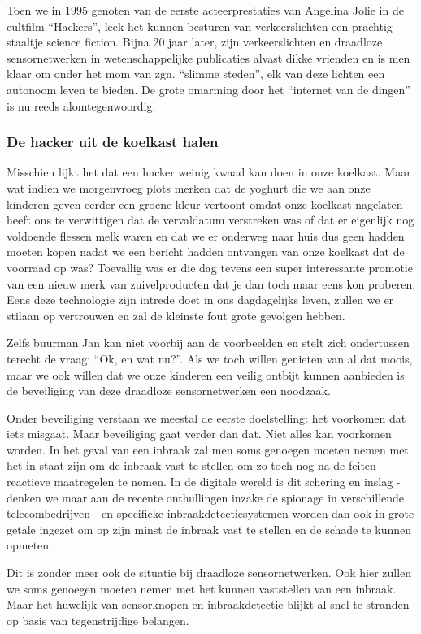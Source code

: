 \documentclass[DIV=calc,paper=a4,fontsize=11pt,twocolumn,draft]{scrartcl}
\newcommand{\heading}[1]{
\subsubsection*{#1}
\vspace{-2mm}
}
\begin{document}
Toen we in 1995 genoten van de eerste acteerprestaties van Angelina Jolie in de
cultfilm ``Hackers'', leek het kunnen besturen van verkeerslichten een prachtig
staaltje science fiction. Bijna 20 jaar later, zijn verkeerslichten en
draadloze sensornetwerken in wetenschappelijke publicaties alvast dikke
vrienden en is men klaar om onder het mom van zgn. ``slimme steden'', elk van
deze lichten een autonoom leven te bieden. De grote omarming door het
``internet van de dingen'' is nu reeds alomtegenwoordig.

\heading{De hacker uit de koelkast halen}

Misschien lijkt het dat een hacker weinig kwaad kan doen in onze koelkast. Maar
wat indien we morgenvroeg plots merken dat de yoghurt die we aan onze kinderen
geven eerder een groene kleur vertoont omdat onze koelkast nagelaten heeft ons
te verwittigen dat de vervaldatum verstreken was of dat er eigenlijk nog
voldoende flessen melk waren en dat we er onderweg naar huis dus geen hadden
moeten kopen nadat we een bericht hadden ontvangen van onze koelkast dat de
voorraad op was? Toevallig was er die dag tevens een super interessante
promotie van een nieuw merk van zuivelproducten dat je dan toch maar eens kon
proberen. Eens deze technologie zijn intrede doet in ons dagdagelijks leven,
zullen we er stilaan op vertrouwen en zal de kleinste fout grote gevolgen
hebben.

Zelfs buurman Jan kan niet voorbij aan de voorbeelden en stelt zich ondertussen
terecht de vraag: ``Ok, en wat nu?''. Als we toch willen genieten van al dat
moois, maar we ook willen dat we onze kinderen een veilig ontbijt kunnen
aanbieden is de beveiliging van deze draadloze sensornetwerken een noodzaak.

Onder beveiliging verstaan we meestal de eerste doelstelling: het voorkomen dat
iets misgaat. Maar beveiliging gaat verder dan dat. Niet alles kan voorkomen
worden. In het geval van een inbraak zal men soms genoegen moeten nemen met het
in staat zijn om de inbraak vast te stellen om zo toch nog na de feiten
reactieve maatregelen te nemen. In de digitale wereld is dit schering en inslag
- denken we maar aan de recente onthullingen inzake de spionage in
verschillende telecombedrijven - en specifieke inbraakdetectiesystemen worden
dan ook in grote getale ingezet om op zijn minst de inbraak vast te stellen en
de schade te kunnen opmeten.

Dit is zonder meer ook de situatie bij draadloze sensornetwerken. Ook hier
zullen we soms genoegen moeten nemen met het kunnen vaststellen van een
inbraak. Maar het huwelijk van sensorknopen en inbraakdetectie blijkt al snel
te stranden op basis van tegenstrijdige belangen.
\end{document}
